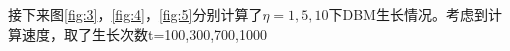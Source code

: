 \documentclass{article}
\begin{document}
接下来图\ref{fig:3}，\ref{fig:4}，\ref{fig:5}分别计算了$ \eta=1,5,10 $下DBM生长情况。考虑到计算速度，取了生长次数t=100,300,700,1000
 \begin{figure}[!h]
	\centering
	

\end{figure}
\end{document}
